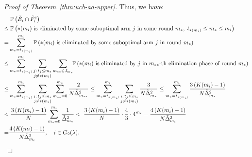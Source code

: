 \documentclass[11pt]{article}
\begin{document}
\begin{proof}[Proof of Theorem~\ref{thm:ucb-aa-upper}]
Thus, we have: 
\begin{align}
&\;\mathbb{P}\left(\tilde{E}_i\cap\tilde{F}_i^c\right)\notag\\
    \leq &\;\mathbb{P}\left(*(m_i) \text{ is eliminated by some suboptimal arm } j \text{ in some round } m_*,\; t_{*(m_i)} \leq m_* \leq m_i\right)\notag\\
   = &\sum_{m_* = t_{*(m_i)}}^{m_i} \mathbb{P}\left(*(m_i) \text{ is eliminated by some suboptimal arm } j \text{ in round } m_*\right) \notag\\
\leq & \sum_{m_* = t_{*(m_i)}}^{m_i} \sum_{\substack{j :\,t_j\leq m_*\\j\neq *(m_i)}}\sum_{m_{**}\in J_{m_*}} \!\!\mathbb{P}\left(*(m_i) \text{ is eliminated by } j \text{ in $m_{**}$-th elimination phase of round } m_*\right) \notag\\
\leq & \sum_{m_* = t_{*(m_i)}}^{m_i}  \sum_{\substack{j :\,t_j\leq m_*\\j\neq *(m_i)}} \sum_{m_{**}=0}^{m_*}\frac{2}{N \tilde{\Delta}_{m_{**}}^2}\leq \sum_{m_* = t_{*(m_i)}}^{m_i}  \sum_{\substack{j :\,t_j\leq m_*\\j\neq *(m_i)}} \frac{3}{N \tilde{\Delta}_{m_*}^2}\leq\sum_{m_* = t_{*(m_i)}}^{m_i}   \frac{3\left(K(m_i)-1\right)}{N \tilde{\Delta}_{m_*}^2}\notag\\
<& \;\frac{3\left(K(m_i)-1\right)}{N } \sum_{m_* = 0}^{m_i}   \frac{1}{ \tilde{\Delta}_{m_*}^2} < \;\frac{3\left(K(m_i)-1\right)}{N}\cdot \frac{4}{3}\cdot4^{m_i}=\frac{4\left(K(m_i)-1\right)}{N\tilde{\Delta}_{m_i}^2}\notag\\
=&\frac{4\left(K(m_i)-1\right)}{N\tilde{\Delta}_{\tilde{m}_i}^2}, \quad i\in G_2(\lambda).
\label{eq: UCB-A3 G-2 b2}
\end{align}


\end{proof}
\end{document}
